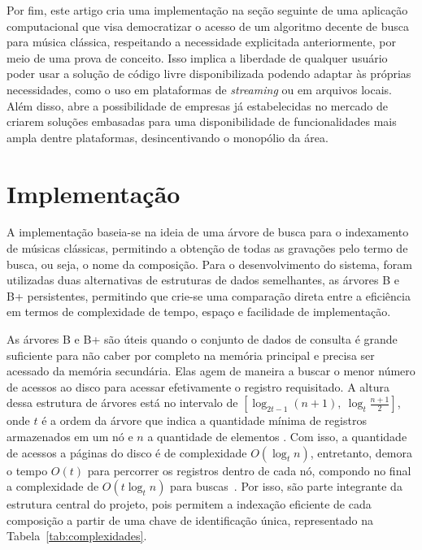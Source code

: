 \documentclass[12pt]{article}
\begin{document}
Por fim, este artigo cria uma implementação na seção seguinte de uma aplicação
computacional que visa democratizar o acesso de um algoritmo decente de busca
para música clássica, respeitando a necessidade explicitada anteriormente, por
meio de uma prova de conceito. Isso implica a liberdade de qualquer usuário
poder usar a solução de código livre disponibilizada podendo adaptar às próprias
necessidades, como o uso em plataformas de \emph{streaming} ou em arquivos
locais. Além disso, abre a possibilidade de empresas já estabelecidas no mercado
de criarem soluções embasadas para uma disponibilidade de funcionalidades mais
ampla dentre plataformas, desincentivando o monopólio da área.

\section{Implementação}

A implementação baseia-se na ideia de uma árvore de busca para o indexamento de
músicas clássicas, permitindo a obtenção de todas as gravações pelo termo de
busca, ou seja, o nome da composição. Para o desenvolvimento do sistema, foram
utilizadas duas alternativas de estruturas de dados semelhantes, as árvores B e
B\nolinebreak+ persistentes, permitindo que crie-se uma comparação direta entre
a eficiência em termos de complexidade de tempo, espaço e facilidade de
implementação.

As árvores B e B\nolinebreak+ são úteis quando o conjunto de dados de consulta é
grande suficiente para não caber por completo na memória principal e precisa ser
acessado da memória secundária. Elas agem de maneira a buscar o menor número de
acessos ao disco para acessar efetivamente o registro requisitado. A altura
dessa estrutura de árvores está no intervalo de $[\log_{2t-1} (n+1),\ \log_t
\frac{n + 1}{2}]$, onde $t$ é a ordem da árvore que indica a quantidade mínima
de registros armazenados em um nó e $n$ a quantidade de elementos
\cite{clrs:22}. Com isso, a quantidade de acessos a páginas do disco é de
complexidade $O(\log_t n)$, entretanto, demora o tempo $O(t)$ para percorrer os
registros dentro de cada nó, compondo no final a complexidade de $O(t \log_t n)$
para buscas~\cite{clrs:22,Pm:10}. Por isso, são parte integrante da estrutura
central do projeto, pois permitem a indexação eficiente de cada composição a
partir de uma chave de identificação única, representado na
Tabela~\ref{tab:complexidades}.
\end{document}
